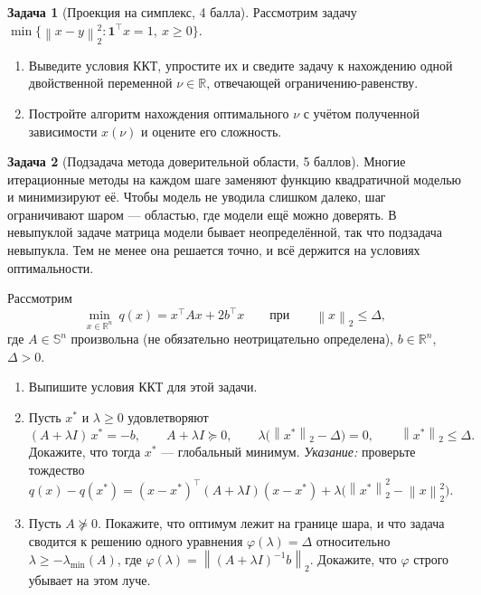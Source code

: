 \documentclass[11pt]{article}
\theoremstyle{definition}
\newtheorem{problem}{Задача}
\theoremstyle{starred}
\theoremstyle{definition}
\theoremstyle{remark}
\theoremstyle{plain}
\theoremstyle{definition}
\newcommand{\R}{\mathbb{R}}
\newcommand{\Sym}{\mathbb{S}}
\newcommand{\norm}[1]{\left\lVert #1 \right\rVert}
\newcommand{\ones}{\mathbf{1}}
\begin{document}
\begin{problem}[Проекция на симплекс, 4 балла]
Рассмотрим задачу
$\min\bigl\{\norm{x - y}_2^{2} : \ones^{\top} x = 1,\ x \ge 0\bigr\}$.
\begin{enumerate}[label=(\alph*), nosep]
  \item Выведите условия ККТ, упростите их и сведите задачу к нахождению одной двойственной
        переменной $\nu \in \R$, отвечающей ограничению-равенству.
  \item Постройте алгоритм нахождения оптимального $\nu$ с учётом полученной зависимости $x(\nu)$
        и оцените его сложность.
\end{enumerate}
\end{problem}

\begin{problem}[Подзадача метода доверительной области, 5 баллов] Многие итерационные методы на каждом шаге заменяют функцию квадратичной моделью и минимизируют
её. Чтобы модель не уводила слишком далеко, шаг ограничивают шаром --- областью, где модели ещё
можно доверять. В невыпуклой задаче матрица модели бывает неопределённой, так что подзадача
невыпукла. Тем не менее она решается точно, и всё держится на условиях оптимальности.

Рассмотрим
\[
\min_{x \in \R^{n}} \ q(x) = x^{\top} A x + 2 b^{\top} x
\qquad\text{при}\qquad \norm{x}_2 \le \Delta,
\]
где $A \in \Sym^{n}$ произвольна (не обязательно неотрицательно определена), $b \in \R^{n}$,
$\Delta > 0$.
\begin{enumerate}[label=(\alph*), nosep]
  \item Выпишите условия ККТ для этой задачи.
  \item Пусть $x^{*}$ и $\lambda \ge 0$ удовлетворяют
        \[
        (A + \lambda I)\,x^{*} = -b,
        \qquad A + \lambda I \succeq 0,
        \qquad \lambda\bigl(\norm{x^{*}}_2 - \Delta\bigr) = 0,
        \qquad \norm{x^{*}}_2 \le \Delta .
        \]
        Докажите, что тогда $x^{*}$ --- глобальный минимум. \emph{Указание:} проверьте тождество
        $q(x) - q(x^{*}) = (x - x^{*})^{\top}(A + \lambda I)(x - x^{*})
        + \lambda\bigl(\norm{x^{*}}_2^{2} - \norm{x}_2^{2}\bigr)$.
  \item Пусть $A \not\succeq 0$. Покажите, что оптимум лежит на границе шара, и что задача сводится
        к решению одного уравнения $\varphi(\lambda) = \Delta$ относительно
        $\lambda \ge -\lambda_{\min}(A)$, где $\varphi(\lambda) = \norm{(A+\lambda I)^{-1}b}_2$.
        Докажите, что $\varphi$ строго убывает на этом луче.
  \end{enumerate}
\end{problem}
\end{document}
